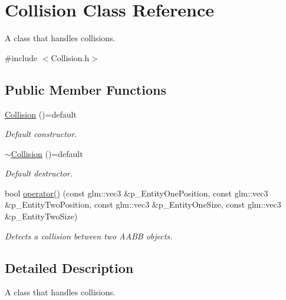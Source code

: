 \hypertarget{class_collision}{}\section{Collision Class Reference}
\label{class_collision}


A class that handles collisions.  




{\ttfamily \#include $<$Collision.\+h$>$}

\subsection*{Public Member Functions}
\begin{DoxyCompactItemize}
\item 
\mbox{\label{class_collision_a1c247612eae832108bf79b78127f35f3}} 
\mbox{\hyperlink{class_collision_a1c247612eae832108bf79b78127f35f3}{Collision}} ()=default
\begin{DoxyCompactList}\small\item\em Default constructor. \end{DoxyCompactList}\item 
\mbox{\label{class_collision_aeb427d5296152744ac2c082d29afa930}} 
\mbox{\hyperlink{class_collision_aeb427d5296152744ac2c082d29afa930}{$\sim$\+Collision}} ()=default
\begin{DoxyCompactList}\small\item\em Default destructor. \end{DoxyCompactList}\item 
bool \mbox{\hyperlink{class_collision_a24c90bfb7d03e440c5d0a753b9682a2a}{operator()}} (const glm\+::vec3 \&p\+\_\+\+Entity\+One\+Position, const glm\+::vec3 \&p\+\_\+\+Entity\+Two\+Position, const glm\+::vec3 \&p\+\_\+\+Entity\+One\+Size, const glm\+::vec3 \&p\+\_\+\+Entity\+Two\+Size)
\begin{DoxyCompactList}\small\item\em Detects a collision between two A\+A\+BB objects. \end{DoxyCompactList}\end{DoxyCompactItemize}


\subsection{Detailed Description}
A class that handles collisions. 

